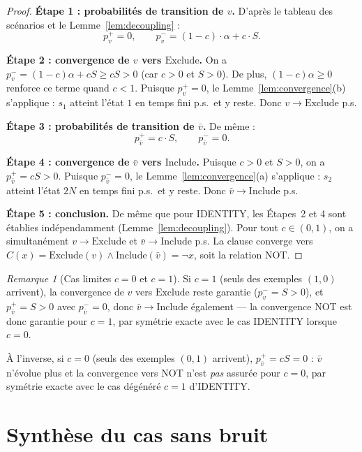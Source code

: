 \documentclass[12pt,a4paper]{article}
\theoremstyle{remark}
\newtheorem{remark}{Remarque}[section]
\newcommand{\Inc}{\ensuremath{\mathrm{Include}}}
\newcommand{\Exc}{\ensuremath{\mathrm{Exclude}}}
\newcommand{\vbar}{\bar{v}}
\begin{document}
\begin{proof}
\textbf{Étape 1 : probabilités de transition de $v$.}
D'après le tableau des scénarios et le Lemme~\ref{lem:decoupling} :
\[
  p^+_v = 0, \qquad p^-_v = (1-c)\cdot \alpha + c\cdot S.
\]

\textbf{Étape 2 : convergence de $v$ vers \Exc.}
On a $p^-_v = (1-c)\alpha + cS \ge cS > 0$ (car $c > 0$ et $S > 0$).
De plus, $(1-c)\alpha \ge 0$ renforce ce terme quand $c < 1$.
Puisque $p^+_v = 0$, le Lemme~\ref{lem:convergence}(b) s'applique :
$s_1$ atteint l'état $1$ en temps fini p.s.\ et y reste.  Donc $v \to \Exc$ p.s.

\textbf{Étape 3 : probabilités de transition de $\vbar$.}
De même :
\[
  p^+_{\vbar} = c\cdot S, \qquad p^-_{\vbar} = 0.
\]

\textbf{Étape 4 : convergence de $\vbar$ vers \Inc.}
Puisque $c > 0$ et $S > 0$, on a $p^+_{\vbar} = cS > 0$.
Puisque $p^-_{\vbar} = 0$, le Lemme~\ref{lem:convergence}(a) s'applique :
$s_2$ atteint l'état $2N$ en temps fini p.s.\ et y reste.  Donc $\vbar \to \Inc$ p.s.

\textbf{Étape 5 : conclusion.}
De même que pour IDENTITY, les Étapes~2 et 4 sont établies indépendamment
(Lemme~\ref{lem:decoupling}).  Pour tout $c \in (0,1)$, on a simultanément
$v \to \Exc$ et $\vbar \to \Inc$ p.s.  La clause converge vers
$C(x) = \Exc(v) \wedge \Inc(\vbar) = \neg x$, soit la relation NOT.
\end{proof}

\begin{remark}[Cas limites $c = 0$ et $c = 1$]
Si $c = 1$ (seuls des exemples $(1,0)$ arrivent), la convergence de $v$ vers \Exc{}
reste garantie ($p^-_v = S > 0$), et $p^+_{\vbar} = S > 0$ avec $p^-_{\vbar} = 0$,
donc $\vbar \to \Inc$ également --- la convergence NOT est donc garantie
pour $c = 1$, par symétrie exacte avec le cas IDENTITY lorsque $c = 0$.

À l'inverse, si $c = 0$ (seuls des exemples $(0,1)$ arrivent), $p^+_{\vbar} = cS = 0$ :
$\vbar$ n'évolue plus et la convergence vers NOT n'est \emph{pas} assurée pour $c=0$,
par symétrie exacte avec le cas dégénéré $c=1$ d'IDENTITY.
\end{remark}

\section{Synthèse du cas sans bruit}\label{sec:synthese_snb}
\end{document}
